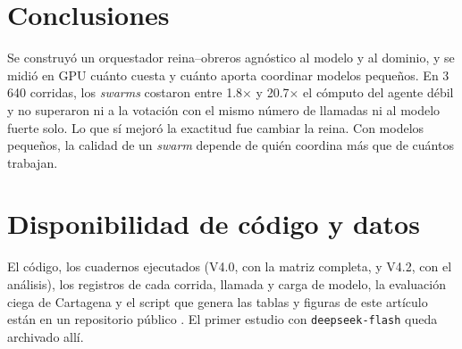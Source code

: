\documentclass[conference]{IEEEtran}
\newcommand{\x}{\ensuremath{\times}}
\begin{document}
\section{Conclusiones}

Se construyó un orquestador reina--obreros agnóstico al modelo y al dominio, y se midió en GPU cuánto cuesta y cuánto aporta coordinar modelos pequeños. En 3\,640 corridas, los \textit{swarms} costaron entre 1.8\x{} y 20.7\x{} el cómputo del agente débil y no superaron ni a la votación con el mismo número de llamadas ni al modelo fuerte solo. Lo que sí mejoró la exactitud fue cambiar la reina. Con modelos pequeños, la calidad de un \textit{swarm} depende de quién coordina más que de cuántos trabajan.

\section*{Disponibilidad de código y datos}
El código, los cuadernos ejecutados (V4.0, con la matriz completa, y V4.2, con el análisis), los registros de cada corrida, llamada y carga de modelo, la evaluación ciega de Cartagena y el script que genera las tablas y figuras de este artículo están en un repositorio público \cite{repo2026swarm}. El primer estudio con \texttt{deepseek-flash} queda archivado allí.
\end{document}
